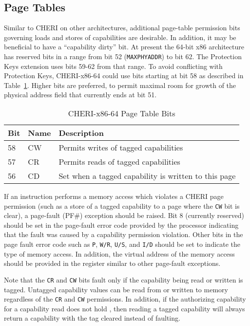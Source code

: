 \subsection{Page Tables}

Similar to CHERI on other architectures, additional page-table
permission bits governing loads and stores of capabilities are
desirable.  In addition, it may be beneficial to have a ``capability
dirty'' bit.  At present the 64-bit x86 architecture has reserved bits
in a range from bit 52 (\texttt{MAXPHYADDR}) to bit 62.  The Protection Keys
extension uses bits 59-62 from that range.  To avoid conflicting with
Protection Keys, CHERI-x86-64 could use bits starting at bit 58 as described in Table~\ref{table:x86:pte}.  Higher bits are
preferred, to permit maximal room for growth of the physical address
field that currently ends at bit 51.

\begin{table}
\begin{center}
\begin{tabular}{lll}
\toprule
Bit & Name & Description \\
\midrule
58 & CW & Permits writes of tagged capabilities \\
57 & CR & Permits reads of tagged capabilities \\
56 & CD & Set when a tagged capability is written to this page \\
\bottomrule
\end{tabular}
\end{center}
\caption{CHERI-x86-64 Page Table Bits}
\label{table:x86:pte}
\end{table}

If an instruction performs a memory access which violates a CHERI page
permission (such as a store of a tagged capability to a page where the
\texttt{CW} bit is clear), a page-fault (PF\#) exception should be
raised.  Bit 8 (currently reserved) should be set in the page-fault
error code provided by the processor indicating that the fault was
caused by a capability permission violation.  Other bits in the page
fault error code such as \texttt{P}, \texttt{W/R}, \texttt{U/S}, and
\texttt{I/D} should be set to indicate the type of memory access.  In
addition, the virtual address of the memory access should be provided
in the \CRTWO{} register similar to other page-fault exceptions.

Note that the \texttt{CR} and \texttt{CW} bits fault only if the
capability being read or written is tagged.  Untagged capability
values can be read from or written to memory regardless of the
\texttt{CR} and \texttt{CW} permissions.  In addition, if the
authorizing capability for a capability read does not hold \cappermLC,
then reading a tagged capability will always return a capability with
the tag cleared instead of faulting.

